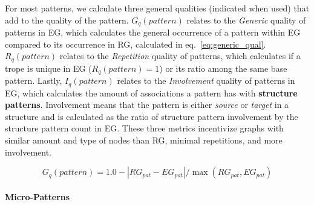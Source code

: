 For most patterns, we calculate three general qualities (indicated when used) that add to the quality of the pattern. $G_{q}(pattern)$ relates to the \textit{Generic} quality of patterns in EG, which calculates the general occurrence of a pattern within EG compared to its occurrence in RG, calculated in eq.~\ref{eq:generic_qual}. $R_{q}(pattern)$ relates to the \textit{Repetition} quality of patterns, which calculates if a trope is unique in EG ($R_{q}(pattern) = 1$) or its ratio among the same base pattern. Lastly, $I_{q}(pattern)$ relates to the \textit{Involvement} quality of patterns in EG, which calculates the amount of associations a pattern has with \textbf{structure patterns}. Involvement means that the pattern is either \textit{source} or \textit{target} in a structure and is calculated as the ratio of structure pattern involvement by the structure pattern count in EG. These three metrics incentivize graphs with similar amount and type of nodes than RG, minimal repetitions, and more involvement. 

\begin{equation}
\label{eq:generic_qual}
    G_{q}(pattern) = 1.0 - |RG_{pat} - EG_{pat}|/\max(RG_{pat}, EG_{pat})
\end{equation}






\paragraph{Micro-Patterns}


